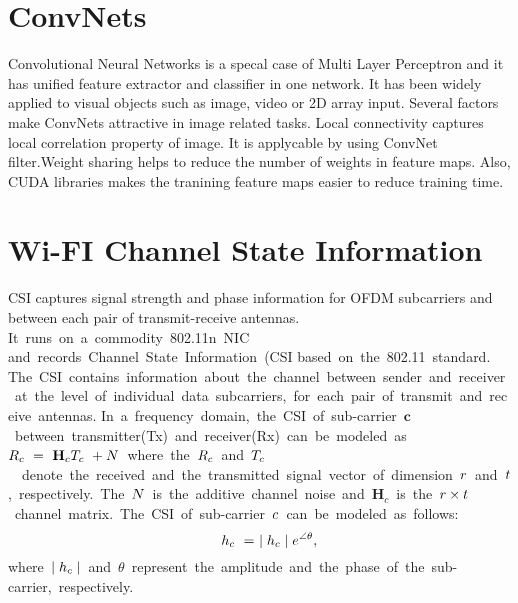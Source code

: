 \label{chp:Survey}

\section{ConvNets}
Convolutional Neural Networks is a specal case of Multi Layer Perceptron and it has unified feature extractor and classifier in one network. It has been widely applied to visual objects such as image, video or 2D array input. Several factors make ConvNets attractive in image related tasks.
Local connectivity captures local correlation property of image. It is applycable by using ConvNet filter.Weight sharing helps to reduce the number of weights in feature maps.
Also, CUDA libraries makes the tranining feature maps easier to reduce training time.

\section{Wi-FI Channel State Information}
CSI captures signal strength and phase information for OFDM subcarriers and between each pair of transmit-receive antennas.
It runs on a commodity 802.11n NIC and records Channel State Information (CSI based on the 802.11 standard.
The CSI contains information about the channel between sender and receiver at the level of individual data subcarriers, for each pair of transmit and receive antennas.
In a frequency domain, the CSI of sub-carrier $\mathbf{c}$ between transmitter(Tx) and receiver(Rx) can be modeled as 
$\mathnormal{R}_{c} = \mathbf{H}_{c}\mathnormal{T}_{c} +\mathnormal{N}$ where the $\mathnormal{R}_{c}$ and $\mathnormal{T}_{c}$  denote the received and the transmitted signal vector of dimension $\mathnormal{r}$ and $\mathnormal{t}$, respectively. The $\mathnormal{N}$ is the additive channel noise and $\mathbf{H}_{c}$ is the $\mathnormal{r}\times\mathnormal{t}$ channel matrix. The CSI of sub-carrier $\mathnormal{c}$ can be modeled as follows:
\begin{equation}
    \mathnormal{h}_{c} = \mid\mathnormal{h}_{c}\mid\mathnormal{e}^{\angle\theta},
\end{equation}
where $\mid\mathnormal{h}_{c}\mid$ and $\theta$ represent the amplitude and the phase of the sub-carrier, respectively.

